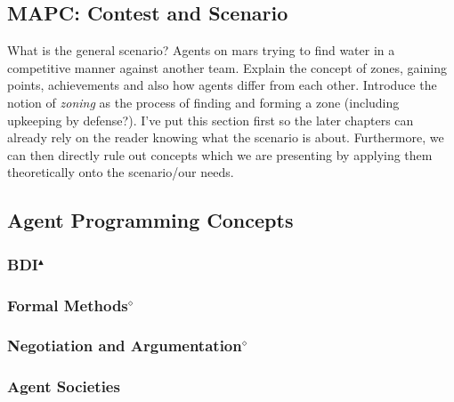 \subsection{MAPC: Contest and Scenario}
What is the general scenario? Agents on mars trying to find water in a competitive manner against another team. Explain the concept of zones, gaining points, achievements and also how agents differ from each other. Introduce the notion of \emph{zoning} as the process of finding and forming a zone (including upkeeping by defense?).
I've put this section first so the later chapters can already rely on the reader knowing what the scenario is about. Furthermore, we can then directly rule out concepts which we are presenting by applying them theoretically onto the scenario/our needs.

\subsection{Agent Programming Concepts}
\subsubsection[BDI.]{BDI$^\blacktriangle$}


\subsubsection[Formal Methods.]{Formal Methods$^\diamond$}


\subsubsection[Negotiation and Argumentation.]{Negotiation and Argumentation$^\diamond$}


\subsubsection{Agent Societies}
